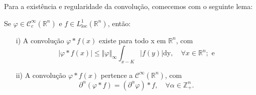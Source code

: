 \documentclass[../distribution_theory_notes.tex]{subfiles}
\begin{document}
Para a existência e regularidade da convolução, comecemos com o seguinte lema:
\begin{lemma*}
	Se \(\varphi \in \mathcal{C}_{c}^{\infty}(\mathbb{R}^{n})\) e \(f\in L_{\mathrm{loc}}^{1}(\mathbb{R}^{n})\), então:
	\begin{itemize}
		\item[i)] A convolução \(\varphi * f(x)\) existe para todo x em \(\mathbb{R}^{n}\), com
		      \[
			      |\varphi *f(x)| \leq \Vert \varphi  \Vert_{\infty} \int_{x-K}^{}|f(y)| \mathrm{dy},\quad \forall x\in \mathbb{R}^{n}; \text{ e}
		      \]
		\item[ii)] A convolução \(\varphi *f(x)\) pertence a \(\mathcal{C}^{\infty}(\mathbb{R}^{n})\), com
		      \[
			      \partial^{\alpha }(\varphi *f)=(\partial^{\alpha }\varphi )*f,\quad \forall \alpha \in \mathbb{Z}_{+}^{n}.
		      \]
	\end{itemize}
\end{lemma*}
\end{document}
